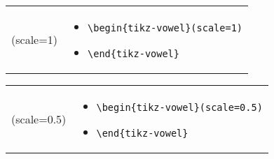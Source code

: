 \documentclass{article}
\def\\{}%
\begin{document}
\begin{center}
\begin{tabular}{rl}
  \begin{minipage}[t]{0.45\textwidth}
  \centering
	\begin{tikz-vowel}(scale=1)
	\end{tikz-vowel}
  \end{minipage} &
  \begin{minipage}[t]{0.2\textwidth}
  \vspace{-65pt}
  {\small
\begin{itemize}[label={}]
	\item \verb|\begin{tikz-vowel}(scale=1)|
	\item \verb|\end{tikz-vowel}|
\end{itemize}
    }
  \end{minipage}\\
\end{tabular}
\end{center}

\begin{center}
\begin{tabular}{rl}
  \begin{minipage}[t]{0.45\textwidth}
  \centering
	\begin{tikz-vowel}(scale=0.5)
	\end{tikz-vowel}
  \end{minipage} &
  \begin{minipage}[t]{0.2\textwidth}
  \vspace{-45pt}
  {\small
\begin{itemize}[label={}]
	\item \verb|\begin{tikz-vowel}(scale=0.5)|
	\item \verb|\end{tikz-vowel}|
\end{itemize}
    }
  \end{minipage}\\
\end{tabular}
\end{center}
\end{document}

